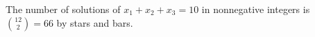 The number of solutions of $x_{1} + x_{2} + x_{3} = 10$ in nonnegative integers is $\binom{12}{2} = 66$ by stars and bars.